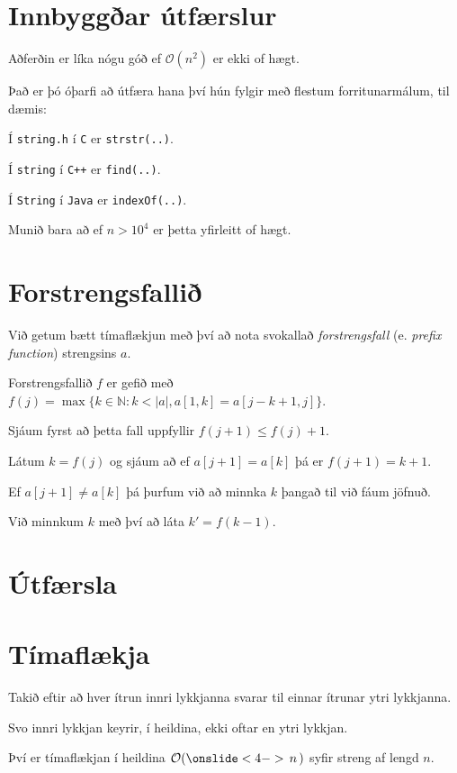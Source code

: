 \section{Innbyggðar útfærslur}
{
    {
        \item<1-> Aðferðin er líka nógu góð ef $\mathcal{O}(n^2)$ er ekki of hægt.
        \item<2-> Það er þó óþarfi að útfæra hana því hún fylgir með flestum forritunarmálum, til dæmis:
        {
            \item<3-> Í \texttt{string.h} í \texttt{C} er \texttt{strstr(..)}.
            \item<4-> Í \texttt{string} í \texttt{C++} er \texttt{find(..)}.
            \item<5-> Í \texttt{String} í \texttt{Java} er \texttt{indexOf(..)}.
        }
        \item<6-> Munið bara að ef $n > 10^4$ er þetta yfirleitt of hægt.
    }
}

\section{Forstrengsfallið}
{
    {
        \item<1-> Við getum bætt tímaflækjun með því að nota svokallað \emph{forstrengsfall} (e. \emph{prefix function}) strengsins $a$.
        \item<2-> Forstrengsfallið $f$ er gefið með $f(j) = \max\{k \in \mathbb{N} \colon k < |a|, a[1,k] = a[j - k + 1, j]\}$.
        \item<3-> Sjáum fyrst að þetta fall uppfyllir $f(j + 1) \leq f(j) + 1$.
        \item<4-> Látum $k = f(j)$ og sjáum að ef $a[j + 1] = a[k]$ þá er $f(j + 1) = k + 1$.
        \item<5-> Ef $a[j + 1] \neq a[k]$ þá þurfum við að minnka $k$ þangað til við fáum jöfnuð.
        \item<6-> Við minnkum $k$ með því að láta $k' = f(k - 1)$.
    }
}

\section{Útfærsla}
{
}

\section{Tímaflækja}
{
    {
        \item<1-> Takið eftir að hver ítrun innri lykkjanna svarar til einnar ítrunar ytri lykkjanna.
        \item<2-> Svo innri lykkjan keyrir, í heildina, ekki oftar en ytri lykkjan.
        \item<3-> Því er tímaflækjan í heildina $\mathcal{O}(\onslide<4->{\,n\,})$ syfir streng af lengd $n$.
    }
}


